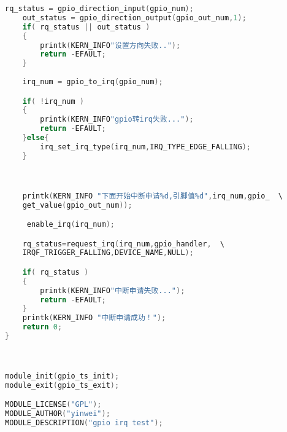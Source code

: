 \documentclass[a4paper,10.5pt]{article}
\begin{document}
\begin{lstlisting}[language=C]
    rq_status = gpio_direction_input(gpio_num);  
    out_status = gpio_direction_output(gpio_out_num,1); 
    if( rq_status || out_status )
    {
        printk(KERN_INFO"设置方向失败..");
        return -EFAULT;
    }
    
    irq_num = gpio_to_irq(gpio_num);

    if( !irq_num )   
    {
        printk(KERN_INFO"gpio转irq失败...");
        return -EFAULT;
    }else{
        irq_set_irq_type(irq_num,IRQ_TYPE_EDGE_FALLING); 
    }



    printk(KERN_INFO "下面开始中断申请%d,引脚值%d",irq_num,gpio_  \
    get_value(gpio_out_num));

     enable_irq(irq_num);   

    rq_status=request_irq(irq_num,gpio_handler,  \
    IRQF_TRIGGER_FALLING,DEVICE_NAME,NULL);

    if( rq_status )
    {
        printk(KERN_INFO"中断申请失败...");
        return -EFAULT;
    }
    printk(KERN_INFO "中断申请成功！");
    return 0;
}



module_init(gpio_ts_init);
module_exit(gpio_ts_exit);

MODULE_LICENSE("GPL");
MODULE_AUTHOR("yinwei");
MODULE_DESCRIPTION("gpio irq test");


    \end{lstlisting}
\end{document}
